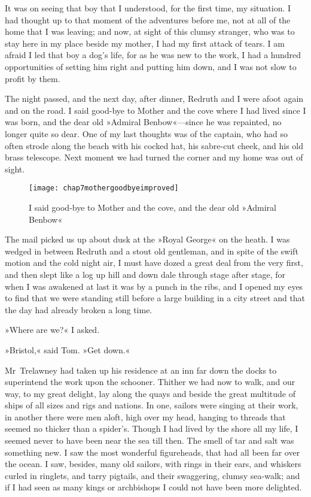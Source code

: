 It was on seeing that boy that I understood, for the first time, my situation. I had thought up to that moment of the adventures before me, not at all of the home that I was leaving; and now, at sight of this clumsy stranger, who was to stay here in my place beside my mother, I had my first attack of tears. I am afraid I led that boy a dog's life, for as he was new to the work, I had a hundred opportunities of setting him right and putting him down, and I was not slow to profit by them.

 

The night passed, and the next day, after dinner, Redruth and I were afoot again and on the road. I said good-bye to Mother and the cove where I had lived since I was born, and the dear old »Admiral Benbow«—since he was repainted, no longer quite so dear. One of my last thoughts was of the captain, who had so often strode along the beach with his cocked hat, his sabre-cut cheek, and his old brass telescope. Next moment we had turned the corner and my home was out of sight.

\begin{figure}[p]
\centering
\texttt{[image: chap7mothergoodbyeimproved]}
\caption[I said good-bye to Mother]{I said good-bye to Mother and the cove, and the dear old »Admiral Benbow«}
\end{figure}


The mail picked us up about dusk at the »Royal George« on the heath. I was wedged in between Redruth and a stout old gentleman, and in spite of the swift motion and the cold night air, I must have dozed a great deal from the very first, and then slept like a log up hill and down dale through stage after stage, for when I was awakened at last it was by a punch in the ribs, and I opened my eyes to find that we were standing still before a large building in a city street and that the day had already broken a long time.

»Where are we?« I asked.

»Bristol,« said Tom. »Get down.«

Mr~Trelawney had taken up his residence at an inn far down the docks to superintend the work upon the schooner. Thither we had now to walk, and our way, to my great delight, lay along the quays and beside the great multitude of ships of all sizes and rigs and nations. In one, sailors were singing at their work, in another there were men aloft, high over my head, hanging to threads that seemed no thicker than a spider's. Though I had lived by the shore all my life, I seemed never to have been near the sea till then. The smell of tar and salt was something new. I saw the most wonderful figureheads, that had all been far over the ocean. I saw, besides, many old sailors, with rings in their ears, and whiskers curled in ringlets, and tarry pigtails, and their swaggering, clumsy sea-walk; and if I had seen as many kings or archbishops I could not have been more delighted.

